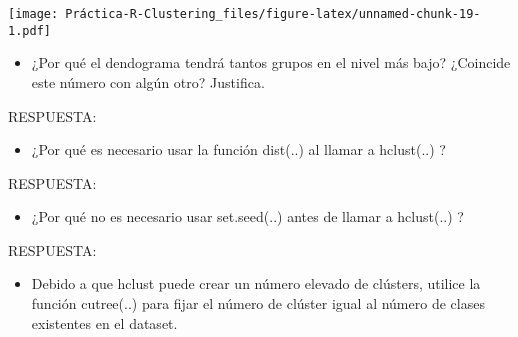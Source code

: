 \documentclass[]{article}
\newenvironment{Shaded}{\begin{snugshade}}{\end{snugshade}}
\newcommand{\CommentTok}[1]{\textcolor[rgb]{0.56,0.35,0.01}{\textit{#1}}}
\newcommand{\DataTypeTok}[1]{\textcolor[rgb]{0.13,0.29,0.53}{#1}}
\newcommand{\DecValTok}[1]{\textcolor[rgb]{0.00,0.00,0.81}{#1}}
\newcommand{\KeywordTok}[1]{\textcolor[rgb]{0.13,0.29,0.53}{\textbf{#1}}}
\newcommand{\NormalTok}[1]{#1}
\newcommand{\OperatorTok}[1]{\textcolor[rgb]{0.81,0.36,0.00}{\textbf{#1}}}
\newcommand{\StringTok}[1]{\textcolor[rgb]{0.31,0.60,0.02}{#1}}
\providecommand{\tightlist}{%
  \setlength{\itemsep}{0pt}\setlength{\parskip}{0pt}}
\begin{document}
\texttt{[image: Práctica-R-Clustering\_files/figure-latex/unnamed-chunk-19-1.pdf]}

\begin{itemize}
\tightlist
\item
  ¿Por qué el dendograma tendrá tantos grupos en el nivel más bajo?
  ¿Coincide este número con algún otro? Justifica.
\end{itemize}

RESPUESTA:

\begin{itemize}
\tightlist
\item
  ¿Por qué es necesario usar la función dist(..) al llamar a hclust(..)
  ?
\end{itemize}

RESPUESTA:

\begin{itemize}
\tightlist
\item
  ¿Por qué no es necesario usar set.seed(..) antes de llamar a
  hclust(..) ?
\end{itemize}

RESPUESTA:

\begin{itemize}
\tightlist
\item
  Debido a que hclust puede crear un número elevado de clústers, utilice
  la función cutree(..) para fijar el número de clúster igual al número
  de clases existentes en el dataset.
\end{itemize}

\begin{Shaded}
\end{Shaded}
\end{document}
